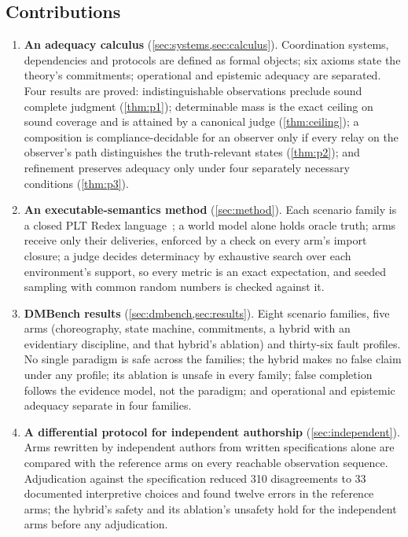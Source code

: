 \subsection{Contributions}

\begin{enumerate}
\item \textbf{An adequacy calculus} (\cref{sec:systems,sec:calculus}). Coordination systems, dependencies and protocols are defined as formal objects; six axioms state the theory's commitments; operational and epistemic adequacy are separated. Four results are proved: indistinguishable observations preclude sound complete judgment (\cref{thm:p1}); determinable mass is the exact ceiling on sound coverage and is attained by a canonical judge (\cref{thm:ceiling}); a composition is compliance-decidable for an observer only if every relay on the observer's path distinguishes the truth-relevant states (\cref{thm:p2}); and refinement preserves adequacy only under four separately necessary conditions (\cref{thm:p3}).
\item \textbf{An executable-semantics method} (\cref{sec:method}). Each scenario family is a closed PLT Redex language~\cite{felleisen2009redex}; a world model alone holds oracle truth; arms receive only their deliveries, enforced by a check on every arm's import closure; a judge decides determinacy by exhaustive search over each environment's support, so every metric is an exact expectation, and seeded sampling with common random numbers is checked against it.
\item \textbf{DMBench results} (\cref{sec:dmbench,sec:results}). Eight scenario families, five arms (choreography, state machine, commitments, a hybrid with an evidentiary discipline, and that hybrid's ablation) and thirty-six fault profiles. No single paradigm is safe across the families; the hybrid makes no false claim under any profile; its ablation is unsafe in every family; false completion follows the evidence model, not the paradigm; and operational and epistemic adequacy separate in four families.
\item \textbf{A differential protocol for independent authorship} (\cref{sec:independent}). Arms rewritten by independent authors from written specifications alone are compared with the reference arms on every reachable observation sequence. Adjudication against the specification reduced 310 disagreements to 33 documented interpretive choices and found twelve errors in the reference arms; the hybrid's safety and its ablation's unsafety hold for the independent arms before any adjudication.
\end{enumerate}

